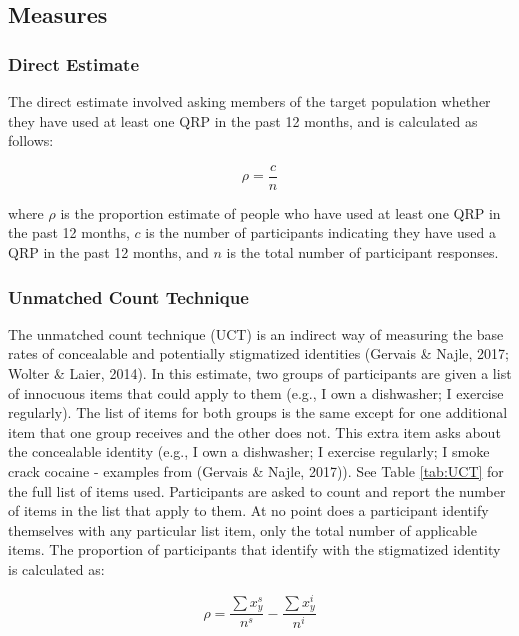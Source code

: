 \documentclass[jou]{apa6}
\theoremstyle{definition}
\theoremstyle{definition}
\theoremstyle{definition}
\theoremstyle{remark}
\begin{document}
\subsection{Measures}\label{measures}

\subsubsection{Direct Estimate}\label{direct-estimate}

The direct estimate involved asking members of the target population
whether they have used at least one QRP in the past 12 months, and is
calculated as follows:

\begin{equation}
\rho = \frac{c}{n}
\end{equation}

where \(\rho\) is the proportion estimate of people who have used at
least one QRP in the past 12 months, \(c\) is the number of participants
indicating they have used a QRP in the past 12 months, and \(n\) is the
total number of participant responses.

\subsubsection{Unmatched Count
Technique}\label{unmatched-count-technique}

The unmatched count technique (UCT) is an indirect way of measuring the
base rates of concealable and potentially stigmatized identities
(Gervais \& Najle, 2017; Wolter \& Laier, 2014). In this estimate, two
groups of participants are given a list of innocuous items that could
apply to them (e.g., I own a dishwasher; I exercise regularly). The list
of items for both groups is the same except for one additional item that
one group receives and the other does not. This extra item asks about
the concealable identity (e.g., I own a dishwasher; I exercise
regularly; I smoke crack cocaine - examples from (Gervais \& Najle,
2017)). See Table \ref{tab:UCT} for the full list of items used.
Participants are asked to count and report the number of items in the
list that apply to them. At no point does a participant identify
themselves with any particular list item, only the total number of
applicable items. The proportion of participants that identify with the
stigmatized identity is calculated as:

\begin{equation}
\rho = \frac{\sum x_y^s}{n^s} - \frac{\sum x_y^i}{n^i}
\end{equation}
\end{document}
